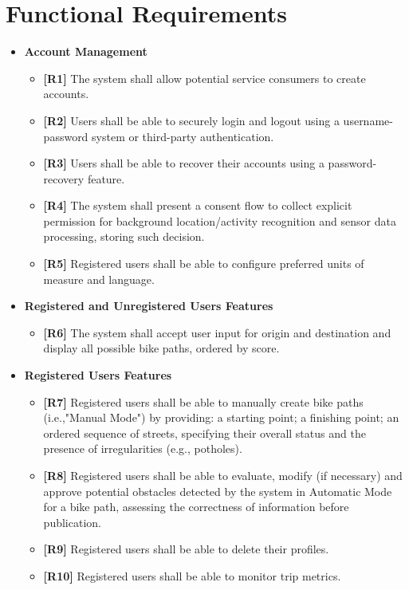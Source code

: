\documentclass{Configuration_Files/PoliMi3i_thesis}
\begin{document}
\newpage
\section{Functional Requirements}

\begin{itemize}
	\item \textbf{Account Management}
	    \begin{itemize}
			\item \textbf{[R1]} The system shall allow potential service consumers to create accounts.
			\item \textbf{[R2]} Users shall be able to securely login and logout using a username-password system or third-party authentication.
			\item \textbf{[R3]} Users shall be able to recover their accounts using a password-recovery feature.
			\item \textbf{[R4]} The system shall present a consent flow to collect explicit permission for background location/activity recognition and sensor data processing, storing such decision.
			\item \textbf{[R5]} Registered users shall be able to configure preferred units of measure and language.
	    \end{itemize}
	\item \textbf{Registered and Unregistered Users Features}
	    \begin{itemize}
			\item \textbf{[R6]} The system shall accept user input for origin and destination and display all possible bike paths, ordered by score.
	    \end{itemize}
	\item \textbf{Registered Users Features}
	    \begin{itemize}
			\item \textbf{[R7]} Registered users shall be able to manually create bike paths (i.e.,"Manual Mode") by providing: a starting point; a finishing point; an ordered sequence of streets, specifying their overall status and the presence of irregularities (e.g., potholes).
			\item \textbf{[R8]} Registered users shall be able to evaluate, modify (if necessary) and approve potential obstacles detected by the system in Automatic Mode for a bike path, assessing the correctness of information before publication.
			\item \textbf{[R9]} Registered users shall be able to delete their profiles.
			\item \textbf{[R10]} Registered users shall be able to monitor trip metrics.

\end{itemize}
\end{itemize}
\end{document}
